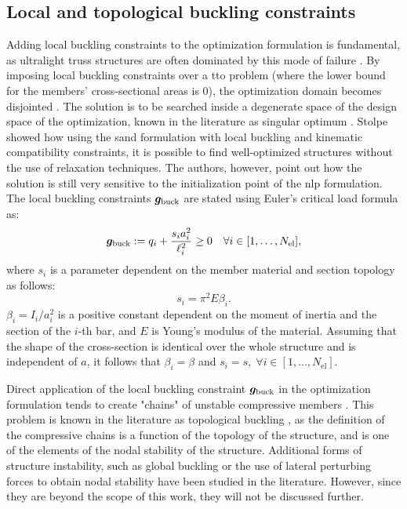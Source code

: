 \subsection{Local and topological buckling constraints}
Adding local buckling constraints to the optimization formulation is fundamental, as ultralight truss structures are often dominated by this mode of failure . By imposing local buckling constraints over a \gls{tto} problem (where the lower bound for the members' cross-sectional areas is 0), the optimization domain becomes disjointed . The solution is to be searched inside a degenerate space of the design space of the optimization, known in the literature as singular optimum . Stolpe  showed how using the \gls{sand} formulation with local buckling and kinematic compatibility constraints, it is possible to find well-optimized structures without the use of relaxation techniques. The authors, however, point out how the solution is still very sensitive to the initialization point of the \gls{nlp} formulation. The local buckling constraints $\bm{g}_{\text{buck}}$ are stated using Euler's critical load formula as:
\begin{equation}
    \bm{g}_{\text{buck}}:=q_i  + \frac{s_i a_i^2}{\ell_i^2} \geq 0 \quad \forall i \in [1,\ldots, N_{\text{el}}],
    \label{eq:04_buck}
\end{equation}
where $s_i$ is a parameter dependent on the member material and section topology as follows:
\begin{equation}
    s_i=\pi^2 E \beta_i.
    \label{eq:04_s}
\end{equation}
$\beta_i=I_i/a^2_i$ is a positive constant dependent on the moment of inertia and the section of the $i$-th bar, and $E$ is Young's modulus of the material. Assuming that the shape of the cross-section is identical over the whole structure and is independent of $a$, it follows that  $\beta_i = \beta$ and $s_i = s, \; \forall i \in [1,\ldots, N_{\text{el}}]$.

Direct application of the local buckling constraint $\bm{g}_{\text{buck}}$ in the optimization formulation tends to create "chains" of unstable compressive members . This problem is known in the literature as topological buckling , as the definition of the compressive chains is a function of the topology of the structure, and is one of the elements of the nodal stability of the structure. Additional forms of structure instability, such as global buckling  or the use of lateral perturbing forces to obtain nodal stability  have been studied in the literature. However, since they are beyond the scope of this work, they will not be discussed further.

